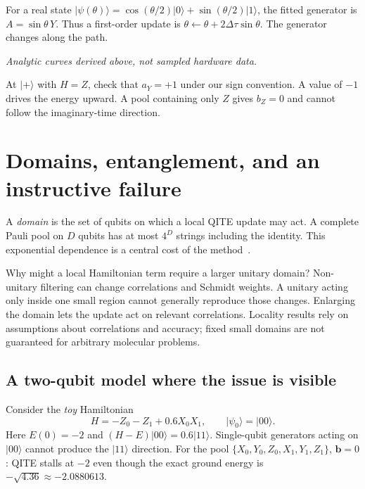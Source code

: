 \documentclass[11pt,a4paper]{article}
\newcommand{\ket}[1]{\lvert #1\rangle}
\newcommand{\dt}{\Delta\tau}
\newcommand{\lesson}[2]{\clearpage\section{#1}\label{#2}}
\begin{document}
For a real state $\ket{\psi(\theta)}=\cos(\theta/2)\ket{0}+\sin(\theta/2)\ket{1}$, the fitted generator is $A=\sin\theta\,Y$. Thus a first-order update is $\theta\leftarrow\theta+2\dt\sin\theta$. The generator changes along the path.

\begin{center}
\end{center}
\small\textit{Analytic curves derived above, not sampled hardware data.}\normalsize

\begin{idea}
At $\ket{+}$ with $H=Z$, check that $a_Y=+1$ under our sign convention. A value of $-1$ drives the energy upward. A pool containing only $Z$ gives $b_Z=0$ and cannot follow the imaginary-time direction.
\end{idea}

\lesson{Domains, entanglement, and an instructive failure}{sec:domain}
A \emph{domain} is the set of qubits on which a local QITE update may act. A complete Pauli pool on $D$ qubits has at most $4^D$ strings including the identity. This exponential dependence is a central cost of the method~\cite{motta}.

Why might a local Hamiltonian term require a larger unitary domain? Non-unitary filtering can change correlations and Schmidt weights. A unitary acting only inside one small region cannot generally reproduce those changes. Enlarging the domain lets the update act on relevant correlations. Locality results rely on assumptions about correlations and accuracy; fixed small domains are not guaranteed for arbitrary molecular problems.

\subsection*{A two-qubit model where the issue is visible}
Consider the \emph{toy} Hamiltonian
\[
H=-Z_0-Z_1+0.6X_0X_1,\qquad \ket{\psi_0}=\ket{00}.
\]
Here $E(0)=-2$ and $(H-E)\ket{00}=0.6\ket{11}$. Single-qubit generators acting on $\ket{00}$ cannot produce the $\ket{11}$ direction. For the pool $\{X_0,Y_0,Z_0,X_1,Y_1,Z_1\}$, $\bm b=0$: QITE stalls at $-2$ even though the exact ground energy is $-\sqrt{4.36}\approx-2.0880613$.
\end{document}
